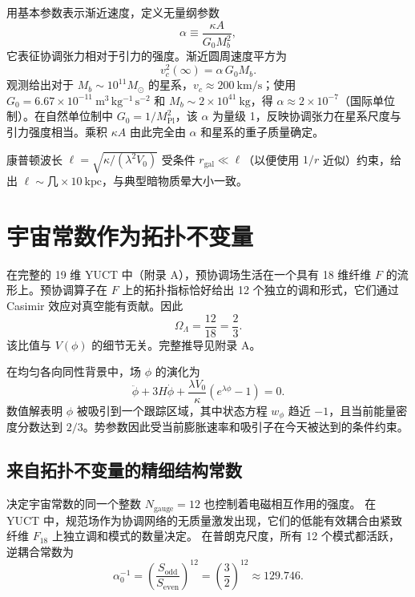 \documentclass[12pt,a4paper]{article}
\begin{document}
	用基本参数表示渐近速度，定义无量纲参数
	\begin{equation}
		\alpha \equiv \frac{\kappa A}{G_0 M_b^2},
		\label{eq:alpha}
	\end{equation}
	它表征协调张力相对于引力的强度。渐近圆周速度平方为
	\begin{equation}
		v_c^2(\infty) = \alpha\, G_0 M_b.
		\label{eq:vc-squared}
	\end{equation}
	观测给出对于 \(M_b \sim 10^{11}M_\odot\) 的星系，\(v_c \approx 200\ \mathrm{km/s}\)；使用 \(G_0 = 6.67\times 10^{-11}\ \mathrm{m^3\,kg^{-1}\,s^{-2}}\) 和 \(M_b \sim 2\times 10^{41}\ \mathrm{kg}\)，得 \(\alpha \approx 2 \times 10^{-7}\)（国际单位制）。在自然单位制中 \(G_0 = 1/M_{\mathrm{Pl}}^2\)，该 \(\alpha\) 为量级 1，反映协调张力在星系尺度与引力强度相当。乘积 \(\kappa A\) 由此完全由 \(\alpha\) 和星系的重子质量确定。
	
	康普顿波长 \(\ell = \sqrt{\kappa/(\lambda^2 V_0)}\) 受条件 \(r_{\mathrm{gal}} \ll \ell\)（以便使用 \(1/r\) 近似）约束，给出 \(\ell \sim \text{几}\times 10\ \mathrm{kpc}\)，与典型暗物质晕大小一致。
	
	\section{宇宙常数作为拓扑不变量}
	
	在完整的 19 维 YUCT 中（附录 A），预协调场生活在一个具有 18 维纤维 \(F\) 的流形上。预协调算子在 \(F\) 上的拓扑指标恰好给出 12 个独立的调和形式，它们通过 Casimir 效应对真空能有贡献。因此
	\begin{equation}
		\Omega_\Lambda = \frac{12}{18} = \frac{2}{3}.
		\label{eq:OmegaLambda}
	\end{equation}
	该比值与 \(V(\phi)\) 的细节无关。完整推导见附录 A。
	
	在均匀各向同性背景中，场 \(\phi\) 的演化为
	\[
	\ddot\phi + 3H \dot\phi + \frac{\lambda V_0}{\kappa}(e^{\lambda\phi}-1) = 0.
	\]
	数值解表明 \(\phi\) 被吸引到一个跟踪区域，其中状态方程 \(w_\phi\) 趋近 \(-1\)，且当前能量密度分数达到 \(2/3\)。势参数因此受当前膨胀速率和吸引子在今天被达到的条件约束。
	
	\subsection{来自拓扑不变量的精细结构常数}
	
	决定宇宙常数的同一个整数 \(N_{\mathrm{gauge}} = 12\) 也控制着电磁相互作用的强度。  
	在 YUCT 中，规范场作为协调网络的无质量激发出现，它们的低能有效耦合由紧致纤维 \(F_{18}\) 上独立调和模式的数量决定。  
	在普朗克尺度，所有 12 个模式都活跃，逆耦合常数为
	\begin{equation}
		\alpha_0^{-1} = \left( \frac{S_{\mathrm{odd}}}{S_{\mathrm{even}}} \right)^{12}
		= \left( \frac{3}{2} \right)^{12} \approx 129.746 .
	\end{equation}
	
\end{document}
